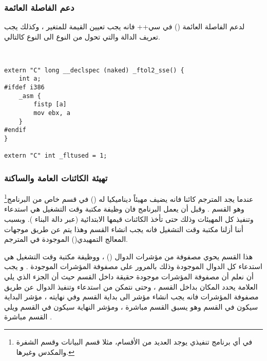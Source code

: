 \documentclass[document.tex]{subfiles}
\begin{document}
\subsubsection{دعم الفاصلة العائمة }
لدعم الفاصلة العائمة () في سي++ فانه يجب تعيين القيمة  للمتغير  ، وكذلك يجب تعريف الدالة  والتي تحول من النوع  الى النوع  كالتالي.

\begin{english}

\lstset{numberstyle=\tiny,numbersep=5pt,tabsize=2,extendedchars=true,breaklines=true,frame=b,showspaces=false, showtabs=false,xleftmargin=10pt,framexleftmargin=10pt,framexrightmargin=5pt,framexbottommargin=4pt,showstringspaces=false,language=C++}

\begin{lstlisting}[label=newdelete,caption=Global new/delete operator]


extern "C" long __declspec (naked) _ftol2_sse() {
	int a;
#ifdef i386
	_asm {
		fistp [a]
		mov	ebx, a
	}
#endif
}

extern "C" int _fltused = 1;

\end{lstlisting}
\end{english}

\subsubsection{تهيئة الكائنات العامة والساكنة}
عندما يجد المترجم كائنا فانه يضيف مهيئاً ديناميكيا له () في قسم خاص من البرنامج\footnote{في أي برنامج تنفيذي يوجد العديد من الأقسام، مثلا قسم البيانات  وقسم الشفرة  والمكدس  وغيرها.} وهو القسم . وقبل أن يعمل البرنامج فان وظيفة مكتبة وقت التشغيل هي استدعاء وتنفيذ كل المهيئات وذلك حتى تأخذ الكائنات قيمها الابتدائية (عبر  دالة البناء ). وبسبب أننا أزلنا مكتبة وقت التشغيل فانه يجب انشاء القسم  وهذا يتم عن طريق موجهات المعالج  التمهيدي() الموجودة في المترجم.

هذا القسم  يحوي مصفوفة من مؤشرات الدوال () ، ووظيفة مكتبة وقت التشغيل هي استدعاء كل الدوال الموجودة وذلك بالمرور على مصفوفة المؤشرات الموجودة . و يجب أن نعلم أن مصفوفة المؤشرات موجودة حقيقة داخل القسم  حيث أن الجزء الذي يلي العلامة  يحدد المكان بداخل القسم ،  وحتى نتمكن من استدعاء وتنفيذ الدوال عن طريق مصفوفة المؤشرات فانه يجب انشاء مؤشر الى بداية القسم  وفي نهايته ، مؤشر البداية سيكون في القسم   وهو يسبق القسم  مباشرة ، ومؤشر النهاية سيكون في القسم  ويلي القسم  مباشرة .
\end{document}
